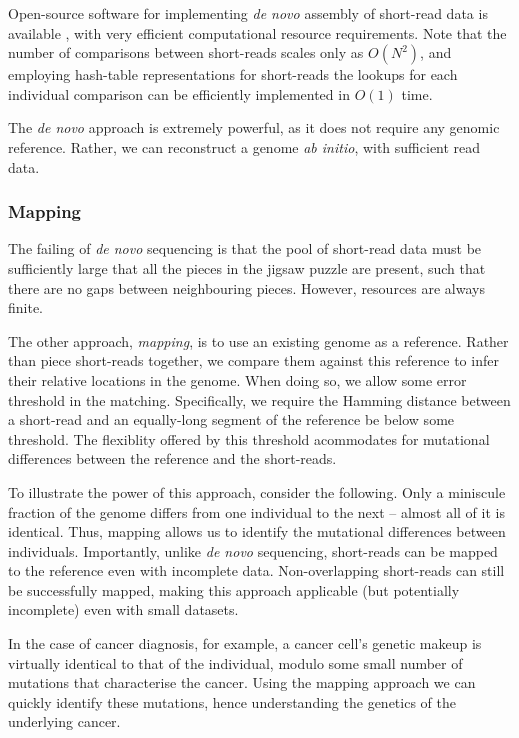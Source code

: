 Open-source software for implementing \textit{de novo} assembly of short-read data is available \cite{velvet}, with very efficient computational resource requirements. Note that the number of comparisons between short-reads scales only as $O(N^2)$, and employing hash-table representations for short-reads the lookups for each individual comparison can be efficiently implemented in $O(1)$ time.

The \textit{de novo} approach is extremely powerful, as it does not require any genomic reference. Rather, we can reconstruct a genome \textit{ab initio}, with sufficient read data.

%
%

\subsubsection{Mapping}

The failing of \textit{de novo} sequencing is that the pool of short-read data must be sufficiently large that all the pieces in the jigsaw puzzle are present, such that there are no gaps between neighbouring pieces. However, resources are always finite.

The other approach, \textit{mapping}, is to use an existing genome as a reference. Rather than piece short-reads together, we compare them against this reference to infer their relative locations in the genome. When doing so, we allow some error threshold in the matching. Specifically, we require the Hamming distance between a short-read and an equally-long segment of the reference be below some threshold. The flexiblity offered by this threshold acommodates for mutational differences between the reference and the short-reads.

To illustrate the power of this approach, consider the following. Only a miniscule fraction of the genome differs from one individual to the next -- almost all of it is identical. Thus, mapping allows us to identify the mutational differences between individuals. Importantly, unlike \textit{de novo} sequencing, short-reads can be mapped to the reference even with incomplete data. Non-overlapping short-reads can still be successfully mapped, making this approach applicable (but potentially incomplete) even with small datasets.

In the case of cancer diagnosis, for example, a cancer cell's genetic makeup is virtually identical to that of the individual, modulo some small number of mutations that characterise the cancer. Using the mapping approach we can quickly identify these mutations, hence understanding the genetics of the underlying cancer.

